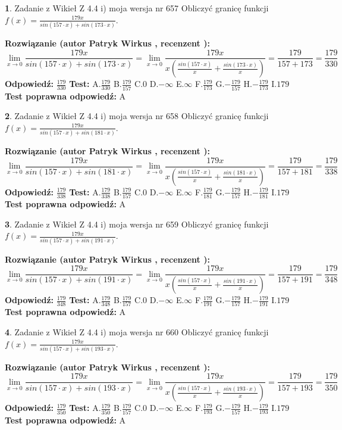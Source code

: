 \documentclass[12pt, a4paper]{article}
\theoremstyle{definition} %
\newtheorem{zad}{}
\newcommand{\zadStart}[1]{\begin{zad}#1\newline}
\newcommand{\zadStop}{\end{zad}}
\newcommand{\rozwStart}[2]{\noindent \textbf{Rozwiązanie (autor #1 , recenzent #2): }\newline}
\newcommand{\rozwStop}{\newline}
\newcommand{\odpStart}{\noindent \textbf{Odpowiedź:}\newline}
\newcommand{\odpStop}{\newline}
\newcommand{\testStart}{\noindent \textbf{Test:}\newline}
\newcommand{\testStop}{\newline}
\newcommand{\kluczStart}{\noindent \textbf{Test poprawna odpowiedź:}\newline}
\newcommand{\kluczStop}{\newline}
\begin{document}
\zadStart{Zadanie z Wikieł Z 4.4 i) moja wersja nr 657}
Obliczyć granicę funkcji $f(x)=\frac{179x}{sin(157\cdot x) +sin(173\cdot x)}$.
\zadStop
\rozwStart{Patryk Wirkus}{}
$$\lim\limits_{x\to 0}\frac{179x}{sin(157\cdot x) +sin(173\cdot x)}=\lim\limits_{x\to 0}\frac{179x}{x(\frac{sin(157\cdot x)}{x}+\frac{sin(173\cdot x)}{x})}=\frac{179}{157+173} = \frac{179}{330}$$
\rozwStop
\odpStart
$\frac{179}{330}$
\odpStop
\testStart
A.$\frac{179}{330}$
B.$\frac{179}{157}$
C.$0$
D.$-\infty$
E.$\infty$
F.$\frac{179}{173}$
G.$-\frac{179}{157}$
H.$-\frac{179}{173}$
I.$179$
\testStop
\kluczStart
A
\kluczStop



\zadStart{Zadanie z Wikieł Z 4.4 i) moja wersja nr 658}
Obliczyć granicę funkcji $f(x)=\frac{179x}{sin(157\cdot x) +sin(181\cdot x)}$.
\zadStop
\rozwStart{Patryk Wirkus}{}
$$\lim\limits_{x\to 0}\frac{179x}{sin(157\cdot x) +sin(181\cdot x)}=\lim\limits_{x\to 0}\frac{179x}{x(\frac{sin(157\cdot x)}{x}+\frac{sin(181\cdot x)}{x})}=\frac{179}{157+181} = \frac{179}{338}$$
\rozwStop
\odpStart
$\frac{179}{338}$
\odpStop
\testStart
A.$\frac{179}{338}$
B.$\frac{179}{157}$
C.$0$
D.$-\infty$
E.$\infty$
F.$\frac{179}{181}$
G.$-\frac{179}{157}$
H.$-\frac{179}{181}$
I.$179$
\testStop
\kluczStart
A
\kluczStop



\zadStart{Zadanie z Wikieł Z 4.4 i) moja wersja nr 659}
Obliczyć granicę funkcji $f(x)=\frac{179x}{sin(157\cdot x) +sin(191\cdot x)}$.
\zadStop
\rozwStart{Patryk Wirkus}{}
$$\lim\limits_{x\to 0}\frac{179x}{sin(157\cdot x) +sin(191\cdot x)}=\lim\limits_{x\to 0}\frac{179x}{x(\frac{sin(157\cdot x)}{x}+\frac{sin(191\cdot x)}{x})}=\frac{179}{157+191} = \frac{179}{348}$$
\rozwStop
\odpStart
$\frac{179}{348}$
\odpStop
\testStart
A.$\frac{179}{348}$
B.$\frac{179}{157}$
C.$0$
D.$-\infty$
E.$\infty$
F.$\frac{179}{191}$
G.$-\frac{179}{157}$
H.$-\frac{179}{191}$
I.$179$
\testStop
\kluczStart
A
\kluczStop



\zadStart{Zadanie z Wikieł Z 4.4 i) moja wersja nr 660}
Obliczyć granicę funkcji $f(x)=\frac{179x}{sin(157\cdot x) +sin(193\cdot x)}$.
\zadStop
\rozwStart{Patryk Wirkus}{}
$$\lim\limits_{x\to 0}\frac{179x}{sin(157\cdot x) +sin(193\cdot x)}=\lim\limits_{x\to 0}\frac{179x}{x(\frac{sin(157\cdot x)}{x}+\frac{sin(193\cdot x)}{x})}=\frac{179}{157+193} = \frac{179}{350}$$
\rozwStop
\odpStart
$\frac{179}{350}$
\odpStop
\testStart
A.$\frac{179}{350}$
B.$\frac{179}{157}$
C.$0$
D.$-\infty$
E.$\infty$
F.$\frac{179}{193}$
G.$-\frac{179}{157}$
H.$-\frac{179}{193}$
I.$179$
\testStop
\kluczStart
A
\kluczStop
\end{document}
